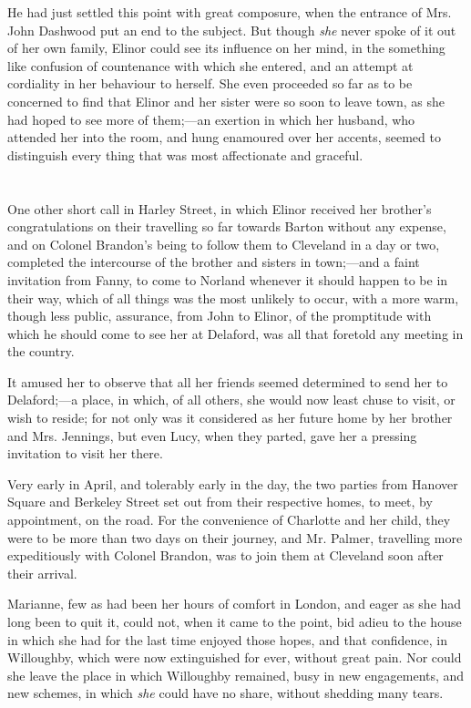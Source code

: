 He had just settled this point with great composure, when the entrance of Mrs. John Dashwood put an end to the subject. But though {\em she} never spoke of it out of her own family, Elinor could see its influence on her mind, in the something like confusion of countenance with which she entered, and an attempt at cordiality in her behaviour to herself. She even proceeded so far as to be concerned to find that Elinor and her sister were so soon to leave town, as she had hoped to see more of them;---an exertion in which her husband, who attended her into the room, and hung enamoured over her accents, seemed to distinguish every thing that was most affectionate and graceful.

\chapter{} %

One other short call in Harley Street, in which Elinor received her brother's congratulations on their travelling so far towards Barton without any expense, and on Colonel Brandon's being to follow them to Cleveland in a day or two, completed the intercourse of the brother and sisters in town;---and a faint invitation from Fanny, to come to Norland whenever it should happen to be in their way, which of all things was the most unlikely to occur, with a more warm, though less public, assurance, from John to Elinor, of the promptitude with which he should come to see her at Delaford, was all that foretold any meeting in the country.

It amused her to observe that all her friends seemed determined to send her to Delaford;---a place, in which, of all others, she would now least chuse to visit, or wish to reside; for not only was it considered as her future home by her brother and Mrs. Jennings, but even Lucy, when they parted, gave her a pressing invitation to visit her there.

Very early in April, and tolerably early in the day, the two parties from Hanover Square and Berkeley Street set out from their respective homes, to meet, by appointment, on the road. For the convenience of Charlotte and her child, they were to be more than two days on their journey, and Mr. Palmer, travelling more expeditiously with Colonel Brandon, was to join them at Cleveland soon after their arrival.

Marianne, few as had been her hours of comfort in London, and eager as she had long been to quit it, could not, when it came to the point, bid adieu to the house in which she had for the last time enjoyed those hopes, and that confidence, in Willoughby, which were now extinguished for ever, without great pain. Nor could she leave the place in which Willoughby remained, busy in new engagements, and new schemes, in which {\em she} could have no share, without shedding many tears.

